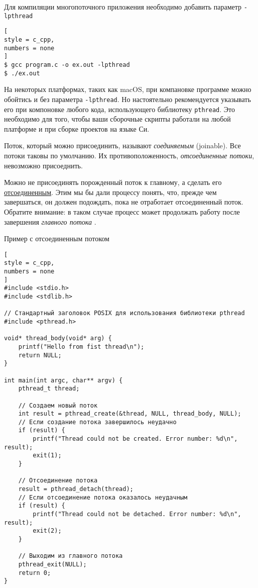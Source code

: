 \documentclass[%
	11pt,
	a4paper,
	utf8,
		]{article}
\begin{document}
Для компиляции многопоточного приложения необходимо добавить параметр \verb|-lpthread|
\begin{lstlisting}[
style = c_cpp,
numbers = none
]
$ gcc program.c -o ex.out -lpthread
$ ./ex.out
\end{lstlisting}

На некоторых платформах, таких как macOS, при компановке программе можно обойтись и без параметра \verb|-lpthread|. Но настоятельно рекомендуется указывать его при компоновке любого кода, использующего библиотеку \verb|pthread|. Это необходимо для того, чтобы ваши сборочные скрипты работали на любой платформе и при сборке проектов на языке Си.

Поток, который можно присоединить, называют \emph{соединяемым} (joinable). Все потоки таковы по умолчанию. Их противоположенность, \emph{отсоединенные потоки}, невозможно присоеднить.

Можно не присоединять порожденный поток к главному, а сделать его \underline{отсоединенным}. Этим мы бы дали процессу понять, что, прежде чем завершаться, он должен подождать, пока не отработает отсоединенный поток. Обратите внимание: в таком случае процесс может продолжать работу после завершения \emph{главного потока} \cite[]{amini-extreme-c:2022}.

Пример с отсоединенным потоком
\begin{lstlisting}[
style = c_cpp,
numbers = none
]
#include <stdio.h>
#include <stdlib.h>

// Стандартный заголовок POSIX для использования библиотеки pthread
#include <pthread.h>

void* thread_body(void* arg) {
    printf("Hello from fist thread\n");
    return NULL;
}

int main(int argc, char** argv) {
    pthread_t thread;
    
    // Создаем новый поток
    int result = pthread_create(&thread, NULL, thread_body, NULL);
    // Если создание потока завершилось неудачно
    if (result) {
        printf("Thread could not be created. Error number: %d\n", result);
        exit(1);
    }
    
    // Отсоединение потока
    result = pthread_detach(thread);
    // Если отсоединение потока оказалось неудачным
    if (result) {
        printf("Thread could not be detached. Error number: %d\n", result);
        exit(2);
    }
    
    // Выходим из главного потока
    pthread_exit(NULL);
    return 0;
}
\end{lstlisting}
\end{document}

